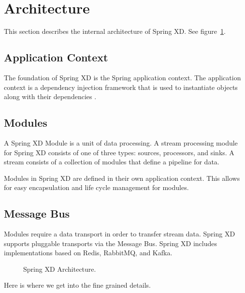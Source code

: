 \section{Architecture}
This section describes the internal architecture of Spring XD. See figure~\ref{fig:architecture}.

\subsection{Application Context}
The foundation of Spring XD is the Spring application context. The application context is a dependency injection framework that is used to instantiate objects along with their dependencies \cite{spring-framework-reference}. 

\subsection{Modules}
A Spring XD Module is a unit of data processing. A stream processing module for Spring XD consists of one of three types: sources, processors, and sinks. A stream consists of a collection of modules that define a pipeline for data.

Modules in Spring XD are defined in their own application context. This allows for easy encapsulation and life cycle management for modules.

\subsection{Message Bus}
Modules require a data transport in order to transfer stream data. Spring XD supports pluggable transports via the Message Bus. Spring XD includes implementations based on Redis, RabbitMQ, and Kafka.

\begin{figure}[ht]
\centering
{}
\caption{Spring XD Architecture.}
\label{fig:architecture}
\end{figure}

Here is where we get into the fine grained details.
